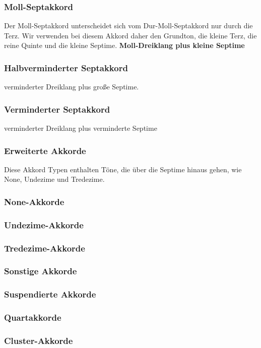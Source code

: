 \subsubsection*{Moll-Septakkord}
Der Moll-Septakkord unterscheidet sich vom Dur-Moll-Septakkord nur durch die Terz. Wir verwenden bei diesem Akkord daher den Grundton, die kleine Terz, die reine Quinte und die kleine Septime.
\textbf{Moll-Dreiklang plus kleine Septime}

\subsubsection*{Halbverminderter Septakkord}
verminderter Dreiklang plus große Septime.
\subsubsection*{Verminderter Septakkord}
verminderter Dreiklang plus verminderte Septime



\subsubsection{Erweiterte Akkorde}
Diese Akkord Typen enthalten Töne, die über die Septime hinaus gehen, wie None, Undezime und Tredezime.
\subsubsection*{None-Akkorde}
\subsubsection*{Undezime-Akkorde}
\subsubsection*{Tredezime-Akkorde}

\subsubsection{Sonstige Akkorde}
\subsubsection*{Suspendierte Akkorde}
\subsubsection*{Quartakkorde}
\subsubsection*{Cluster-Akkorde}
